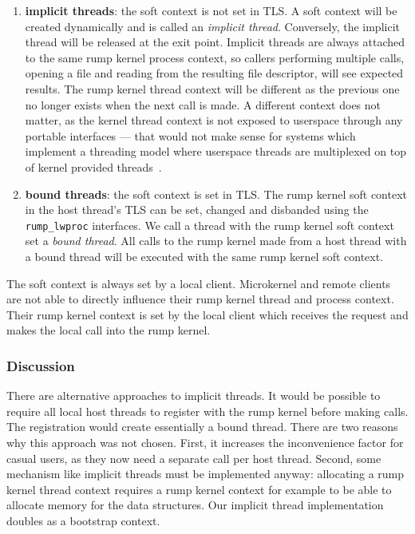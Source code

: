 \begin{enumerate}
\item \textbf{implicit threads}: the soft context is not set
in TLS.  A soft context will be created dynamically and is called
an \textit{implicit thread}.  Conversely, the implicit thread will be
released at the exit point.  Implicit threads are always attached to the
same rump kernel process context, so callers performing multiple calls,
\eg opening a file and reading from the resulting file descriptor,
will see expected results.  The rump kernel thread context will be
different as the previous one no longer exists when the next call
is made.  A different context does not matter, as the kernel thread
context is not exposed to userspace through any portable interfaces
--- that would not make sense for systems which implement a threading
model where userspace threads are multiplexed on top of kernel provided
threads~\cite{anderson:scheduler_activations}.

\item \textbf{bound threads}: the soft context is set in TLS.
The rump kernel soft context in the host thread's TLS can be set,
changed and disbanded using the \verb+rump_lwproc+ interfaces.
We call a thread with the rump
kernel soft context set a \textit{bound thread}.  All calls to the rump
kernel made from a host thread with a bound thread will be executed with
the same rump kernel soft context.
\end{enumerate}

The soft context is always set by a local client.  Microkernel and
remote clients are not able to directly influence their rump kernel thread
and process context.  Their rump kernel context is set by the local client
which receives the request and makes the local call into the rump kernel.

\subsubsection*{Discussion}

There are alternative approaches to implicit threads.  It would
be possible to require all local host threads to register with the rump
kernel before making calls.  The registration would create essentially
a bound thread.  There are two reasons why this approach was not chosen.
First, it increases the inconvenience factor for casual users, as they
now need a separate call per host thread.  Second, some mechanism
like implicit threads must be implemented anyway: allocating a rump
kernel thread context requires a rump kernel context for example to be
able to allocate memory for the data structures.  Our implicit thread
implementation doubles as a bootstrap context.

